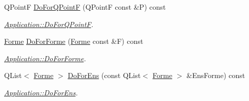 \begin{DoxyCompactItemize}
Q\+Point\+F \hyperlink{class_application_aa56c9ed2f93b4c07ef216640306798bf}{Do\+For\+Q\+Point\+F} (Q\+Point\+F const \&P) const 
\begin{DoxyCompactList}\small\item\em \hyperlink{class_application_aa56c9ed2f93b4c07ef216640306798bf}{Application\+::\+Do\+For\+Q\+Point\+F}. \end{DoxyCompactList}\item 
\hyperlink{class_forme}{Forme} \hyperlink{class_application_ae7180fb4ac871614e75a09abbec7fc98}{Do\+For\+Forme} (\hyperlink{class_forme}{Forme} const \&F) const 
\begin{DoxyCompactList}\small\item\em \hyperlink{class_application_ae7180fb4ac871614e75a09abbec7fc98}{Application\+::\+Do\+For\+Forme}. \end{DoxyCompactList}\item 
Q\+List$<$ \hyperlink{class_forme}{Forme} $>$ \hyperlink{class_application_adb1c2b8cfcc50ff0d5b0a69a625dd8de}{Do\+For\+Ens} (const Q\+List$<$ \hyperlink{class_forme}{Forme} $>$ \&Ens\+Forme) const 
\begin{DoxyCompactList}\small\item\em \hyperlink{class_application_adb1c2b8cfcc50ff0d5b0a69a625dd8de}{Application\+::\+Do\+For\+Ens}. \end{DoxyCompactList}\end{DoxyCompactItemize}
